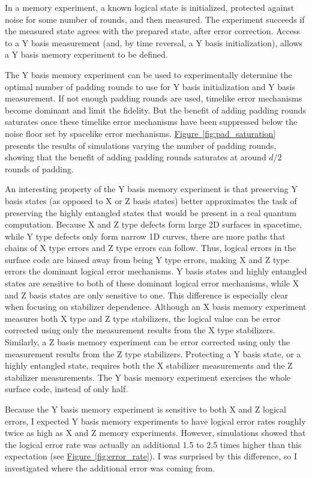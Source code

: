 \documentclass[onecolumn,unpublished,a4paper]{quantumarticle}
\theoremstyle{definition}
\theoremstyle{definition}
\theoremstyle{definition}
\newcommand{\fig}[1]{\hyperref[fig:#1]{Figure~\ref*{fig:#1}}}
\begin{document}
In a memory experiment, a known logical state is initialized, protected against noise for some number of rounds, and then measured.
The experiment succeeds if the measured state agrees with the prepared state, after error correction.
Access to a Y basis measurement (and, by time reversal, a Y basis initialization), allows a Y basis memory experiment to be defined.

The Y basis memory experiment can be used to experimentally determine the optimal number of padding rounds to use for Y basis initialization and Y basis measurement.
If not enough padding rounds are used, timelike error mechanisms become dominant and limit the fidelity.
But the benefit of adding padding rounds saturates once these timelike error mechanisms have been suppressed below the noise floor set by spacelike error mechanisms.
\fig{pad_saturation} presents the results of simulations varying the number of padding rounds, showing that the benefit of adding padding rounds saturates at around $d/2$ rounds of padding.

An interesting property of the Y basis memory experiment is that preserving Y basis states (as opposed to X or Z basis states) better approximates the task of preserving the highly entangled states that would be present in a real quantum computation.
Because X and Z type defects form large 2D surfaces in spacetime, while Y type defects only form narrow 1D curves, there are more paths that chains of X type errors and Z type errors can follow.
Thus, logical errors in the surface code are biased away from being Y type errors, making X and Z type errors the dominant logical error mechanisms.
Y basis states and highly entangled states are sensitive to both of these dominant logical error mechanisms, while X and Z basis states are only sensitive to one.
This difference is especially clear when focusing on stabilizer dependence.
Although an X basis memory experiment measures both X type and Z type stabilizers, the logical value can be error corrected using only the measurement results from the X type stabilizers.
Similarly, a Z basis memory experiment can be error corrected using only the measurement results from the Z type stabilizers.
Protecting a Y basis state, or a highly entangled state, requires both the X stabilizer measurements and the Z stabilizer measurements.
The Y basis memory experiment exercises the whole surface code, instead of only half.

Because the Y basis memory experiment is sensitive to both X and Z logical errors, I expected Y basis memory experiments to have logical error rates roughly twice as high as X and Z memory experiments.
However, simulations showed that the logical error rate was actually an additional 1.5 to 2.5 times higher than this expectation (see \fig{error_rate}).
I was surprised by this difference, so I investigated where the additional error was coming from.
\end{document}
